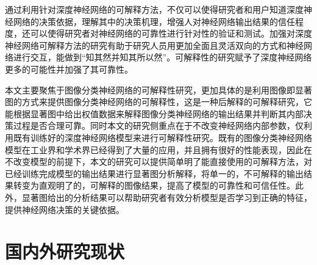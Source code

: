 通过利用针对深度神经网络的可解释方法，不仅可以使得研究者和用户知道深度神经网络的决策依据，理解其中的决策机理，增强人对神经网络输出结果的信任程度，还可以使得研究者对神经网络的可靠性进行针对性的验证和测试。加强对深度神经网络可解释方法的研究有助于研究人员用更加全面且灵活双向的方式和神经网络进行交互，能做到“知其然并知其所以然”。可解释性的研究赋予了深度神经网络更多的可能性并加强了其可靠性。

本文主要聚焦于图像分类神经网络的可解释性研究，更加具体的是利用图像即显著图的方式来提供图像分类神经网络的可解释性，这是一种后解释的可解释研究，它能根据显著图中给出权值数据来解释图像分类神经网络的输出结果并判断其内部决策过程是否合理可靠。同时本文的研究侧重点在于不改变神经网络内部参数，仅利用既有训练好的深度神经网络模型来进行可解释性研究。既有的图像分类神经网络模型在工业界和学术界已经得到了大量的应用，并且拥有很好的性能表现，因此在不改变模型的前提下，本文的研究可以提供简单明了能直接使用的可解释方法，对已经训练完成模型的输出结果进行显著图分析解释，将单一的，不可解释的输出结果转变为直观明了的，可解释的图像结果，提高了模型的可靠性和可信任性。此外，显著图给出的分析结果可以帮助研究者有效分析模型是否学习到正确的特征，提供神经网络决策的关键依据。





\section{国内外研究现状}
